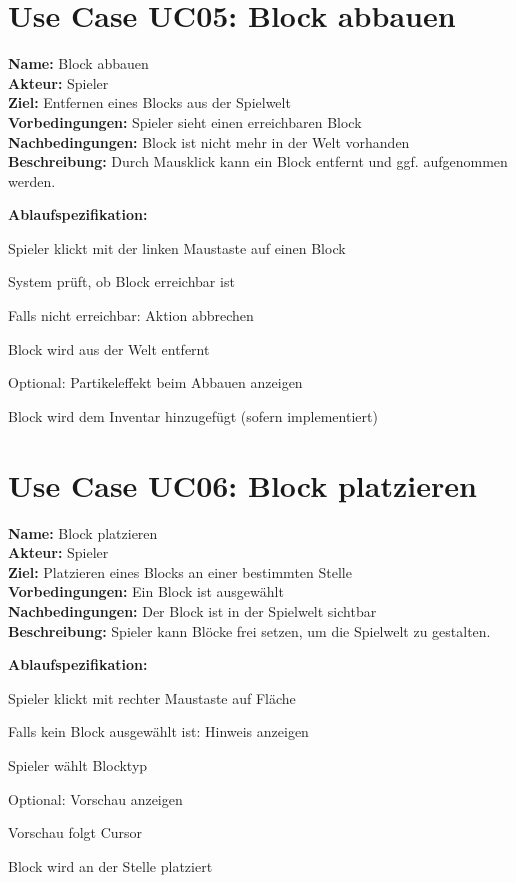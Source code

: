 \documentclass{article}
\newcommand{\opt}{\ensuremath{\parallel}}
\begin{document}
\section*{Use Case UC05: Block abbauen}

\textbf{Name:} Block abbauen \\
\textbf{Akteur:} Spieler \\
\textbf{Ziel:} Entfernen eines Blocks aus der Spielwelt \\
\textbf{Vorbedingungen:} Spieler sieht einen erreichbaren Block \\
\textbf{Nachbedingungen:} Block ist nicht mehr in der Welt vorhanden \\
\textbf{Beschreibung:} Durch Mausklick kann ein Block entfernt und ggf. aufgenommen werden.

\textbf{Ablaufspezifikation:}
\begin{description}[style=nextline,leftmargin=1.5cm,labelwidth=1.2cm]
  \item[1.] Spieler klickt mit der linken Maustaste auf einen Block
  \item[2.] System prüft, ob Block erreichbar ist
  \item[2a.] Falls nicht erreichbar: Aktion abbrechen
  \item[3.] Block wird aus der Welt entfernt
  \item[3\opt a.] Optional: Partikeleffekt beim Abbauen anzeigen
  \item[4.] Block wird dem Inventar hinzugefügt (sofern implementiert)
\end{description}


\section*{Use Case UC06: Block platzieren}

\textbf{Name:} Block platzieren \\
\textbf{Akteur:} Spieler \\
\textbf{Ziel:} Platzieren eines Blocks an einer bestimmten Stelle \\
\textbf{Vorbedingungen:} Ein Block ist ausgewählt \\
\textbf{Nachbedingungen:} Der Block ist in der Spielwelt sichtbar \\
\textbf{Beschreibung:} Spieler kann Blöcke frei setzen, um die Spielwelt zu gestalten.

\textbf{Ablaufspezifikation:}
\begin{description}[style=nextline,leftmargin=1.5cm,labelwidth=1.2cm]
  \item[1.] Spieler klickt mit rechter Maustaste auf Fläche
  \item[1a.] Falls kein Block ausgewählt ist: Hinweis anzeigen
  \item[1a.1.] Spieler wählt Blocktyp
  \item[1\opt b.] Optional: Vorschau anzeigen
  \item[1\opt b.1.] Vorschau folgt Cursor
  \item[2.] Block wird an der Stelle platziert
\end{description}
\end{document}

